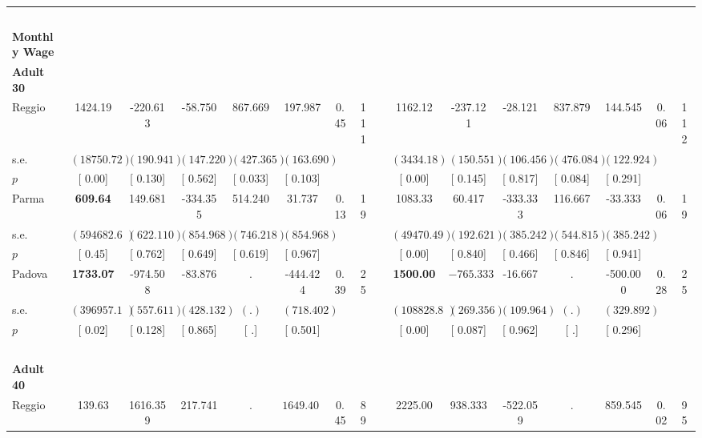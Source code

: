 \begin{longtable}{L{8em} c c c c c c c p{1em} c c c c c c c}
~\\[1em]
\textbf{Monthly Wage} \\*
\quad \quad \textbf{Adult 30} & & & & & & & & & & & & & & & \\* 
\quad \quad \quad Reggio& 1424.19 &  -220.613 &   -58.750 & $ \mathbf{  867.669}$ &   197.987 &      0.45 &       111 & & 1162.12 &  -237.121 &   -28.121 & $ \mathbf{  837.879}$ &   144.545 &      0.06 &       112  \\*
\quad \quad \quad \quad s.e.& $ ( 18750.72)$ & $ (  190.941)$ & $ (  147.220)$ & $ (  427.365)$ & $ (  163.690)$ & & & & $ (  3434.18)$ & $ (  150.551)$ & $ (  106.456)$ & $ (  476.084)$ & $ (  122.924)$ & &  \\*
\quad \quad \quad \quad $ p$ & [     0.00] & [    0.130] & [    0.562] & [    0.033] & [    0.103] & & & & [     0.00] & [    0.145] & [    0.817] & [    0.084] & [    0.291] & &  \\[1em]
\quad \quad \quad Parma& \textbf{   609.64} &   149.681 &  -334.355 &   514.240 &    31.737 &      0.13 &        19 & & 1083.33 &    60.417 &  -333.333 &   116.667 &   -33.333 &      0.06 &        19  \\*
\quad \quad \quad \quad s.e.& $ (594682.66)$ & $ (  622.110)$ & $ (  854.968)$ & $ (  746.218)$ & $ (  854.968)$ & & & & $ ( 49470.49)$ & $ (  192.621)$ & $ (  385.242)$ & $ (  544.815)$ & $ (  385.242)$ & &  \\*
\quad \quad \quad \quad $ p$ & [     0.45] & [    0.762] & [    0.649] & [    0.619] & [    0.967] & & & & [     0.00] & [    0.840] & [    0.466] & [    0.846] & [    0.941] & &  \\[1em]
\quad \quad \quad Padova& \textbf{  1733.07} &  -974.508 &   -83.876 &         . &  -444.424 &      0.39 &        25 & & \textbf{  1500.00} & $ \mathbf{ -765.333}$ &   -16.667 &         . &  -500.000 &      0.28 &        25  \\*
\quad \quad \quad \quad s.e.& $ (396957.18)$ & $ (  557.611)$ & $ (  428.132)$ & $ (        .)$ & $ (  718.402)$ & & & & $ (108828.83)$ & $ (  269.356)$ & $ (  109.964)$ & $ (        .)$ & $ (  329.892)$ & &  \\*
\quad \quad \quad \quad $ p$ & [     0.02] & [    0.128] & [    0.865] & [        .] & [    0.501] & & & & [     0.00] & [    0.087] & [    0.962] & [        .] & [    0.296] & &  \\[1em]
~\\[1em]
\quad \quad \textbf{Adult 40} & & & & & & & & & & & & & & & \\* 
\quad \quad \quad Reggio& 139.63 &  1616.359 &   217.741 &         . & $ \mathbf{ 1649.408}$ &      0.45 &        89 & & 2225.00 &   938.333 &  -522.059 &         . &   859.545 &      0.02 &        95  \\*

\end{longtable}
